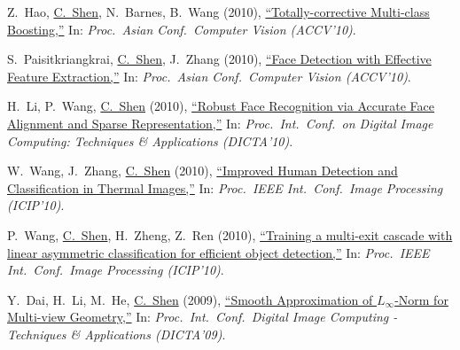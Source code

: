 \documentclass[9pt, a4paper]{article}
\newcommand{\years}[1]{\marginnote{\scriptsize #1}}
\def\highlight{\uline}
\begin{document}
\medskip

\years{2010} Z.~Hao, \highlight{C.~Shen}, N.~Barnes, B.~Wang (2010),
\href{http://www.google.com/search?lr=&ie=UTF-8&oe=UTF-8&q=Totally-corrective+Multi-class+Boosting+Zhihui+Hao%2C+Chunhua+Shen%2C+Nick+Barnes%2C+Bo+Wang}{``Totally-corrective Multi-class Boosting,{}''}
In: \emph{Proc.\ Asian Conf.\  Computer Vision (ACCV'10)}.

\medskip

\years{2010} S.~Paisitkriangkrai, \highlight{C.~Shen}, J.~Zhang (2010),
\href{http://www.google.com/search?lr=&ie=UTF-8&oe=UTF-8&q=Face+Detection+with+Effective+Feature+Extraction+Sakrapee+Paisitkriangkrai%2C+Chunhua+Shen%2C+Jian+Zhang}{``Face Detection with Effective Feature Extraction,{}''}
In: \emph{Proc.\ Asian Conf.\  Computer Vision (ACCV'10)}.

\medskip

\years{2010} H.~Li, P.~Wang, \highlight{C.~Shen} (2010),
\href{http://www.google.com/search?lr=&ie=UTF-8&oe=UTF-8&q=Robust+Face+Recognition+via+Accurate+Face+Alignment+and+Sparse+Representation+Hanxi+Li%2C+Peng+Wang%2C+Chunhua+Shen}{``Robust Face Recognition via Accurate Face Alignment and Sparse Representation,{}''}
In: \emph{Proc.\ Int.\ Conf.\  on Digital Image Computing: Techniques \& Applications (DICTA'10)}.

\medskip

\years{2010} W.~Wang, J.~Zhang, \highlight{C.~Shen} (2010),
\href{http://www.google.com/search?lr=&ie=UTF-8&oe=UTF-8&q=Improved+Human+Detection+and+Classification+in+Thermal+Images+Weihong+Wang%2C+Jian+Zhang%2C+Chunhua+Shen}{``Improved Human Detection and Classification in Thermal Images,{}''}
In: \emph{Proc.\ IEEE Int.\ Conf.\  Image Processing (ICIP'10)}.

\medskip

\years{2010} P.~Wang, \highlight{C.~Shen}, H.~Zheng, Z.~Ren (2010),
\href{http://www.google.com/search?lr=&ie=UTF-8&oe=UTF-8&q=Training+a+multi-exit+cascade+with+linear+asymmetric+classification+for+efficient+object+detection+Peng+Wang%2C+Chunhua+Shen%2C+Hong+Zheng%2C+Zhang+Ren}{``Training a multi-exit cascade with linear asymmetric classification for efficient object detection,{}''}
In: \emph{Proc.\ IEEE Int.\ Conf.\  Image Processing (ICIP'10)}.

\medskip

\years{2009} Y.~Dai, H.~Li, M.~He, \highlight{C.~Shen} (2009),
\href{http://www.google.com/search?lr=&ie=UTF-8&oe=UTF-8&q=Smooth+Approximation+of+-Norm+for+Multi-view+Geometry+Yuchao+Dai%2C+Hongdong+Li%2C+Mingyi+He%2C+Chunhua+Shen}{``Smooth Approximation of $L_\infty$-Norm for Multi-view Geometry,{}''}
In: \emph{Proc.\ Int.\ Conf.\  Digital Image Computing - Techniques \& Applications (DICTA'09)}.
\end{document}
